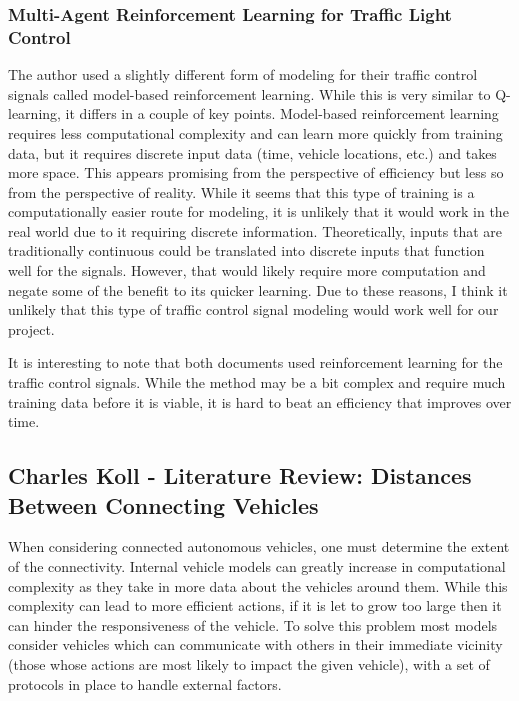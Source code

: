 \documentclass[onecolumn, draftclsnofoot,10pt, compsoc]{IEEEtran}
\begin{document}
\subsubsection{Multi-Agent Reinforcement Learning for Traffic Light Control \cite{wiering2000multi}}
The author used a slightly different form of modeling for their traffic control signals called model-based reinforcement learning.
While this is very similar to Q-learning, it differs in a couple of key points.
Model-based reinforcement learning requires less computational complexity and can learn more quickly from training data, but it requires discrete input data (time, vehicle locations, etc.) and takes more space.
This appears promising from the perspective of efficiency but less so from the perspective of reality.
While it seems that this type of training is a computationally easier route for modeling, it is unlikely that it would work in the real world due to it requiring discrete information.
Theoretically, inputs that are traditionally continuous could be translated into discrete inputs that function well for the signals.
However, that would likely require more computation and negate some of the benefit to its quicker learning.
Due to these reasons, I think it unlikely that this type of traffic control signal modeling would work well for our project.

It is interesting to note that both documents used reinforcement learning for the traffic control signals.
While the method may be a bit complex and require much training data before it is viable, it is hard to beat an efficiency that improves over time.
\subsection{Charles Koll - Literature Review: Distances Between Connecting Vehicles}
When considering connected autonomous vehicles, one must determine the extent of the connectivity.
Internal vehicle models can greatly increase in computational complexity as they take in more data about the vehicles around them.
While this complexity can lead to more efficient actions, if it is let to grow too large then it can hinder the responsiveness of the vehicle.
To solve this problem most models consider vehicles which can communicate with others in their immediate vicinity (those whose actions are most likely to impact the given vehicle), with a set of protocols in place to handle external factors.
\end{document}
